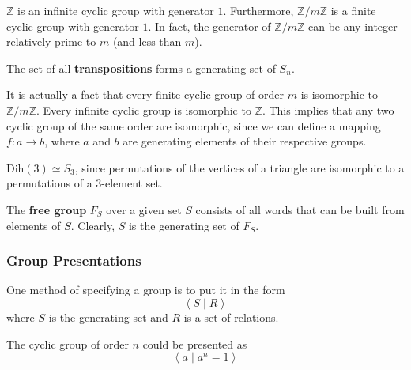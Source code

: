 \documentclass{article}
\begin{document}
      \begin{example}
        $\mathbb{Z}$ is an infinite cyclic group with generator $1$. Furthermore, $\mathbb{Z}/m\mathbb{Z}$ is a finite cyclic group with generator $1$. In fact, the generator of $\mathbb{Z}/m\mathbb{Z}$ can be any integer relatively prime to $m$ (and less than $m$). \end{example}

      \begin{example}
        The set of all \textbf{transpositions} forms a generating set of $S_{n}$. 
      \end{example}

      It is actually a fact that every finite cyclic group of order $m$ is isomorphic to $\mathbb{Z}/m\mathbb{Z}$. Every infinite cyclic group is isomorphic to $\mathbb{Z}$. This implies that any two cyclic group of the same order are isomorphic, since we can define a mapping $f:a\longrightarrow b$, where $a$ and $b$ are generating elements of their respective groups. 

      \begin{example}
        Dih$(3) \simeq S_{3}$, since permutations of the vertices of a triangle are isomorphic to a permutations of a 3-element set. 
      \end{example}

      \begin{definition}
        The \textbf{free group} $F_{S}$ over a given set $S$ consists of all words that can be built from elements of $S$. Clearly, $S$ is the generating set of $F_{S}$. 
      \end{definition}

    \subsubsection{Group Presentations}

      One method of specifying a group is to put it in the form
      \begin{equation}
        \big\langle \; S \; | \; R \;\big\rangle
      \end{equation}
      where $S$ is the generating set and $R$ is a set of relations. 

      \begin{example}
        The cyclic group of order $n$ could be presented as
        \begin{equation}
          \big\langle \; a \; | \; a^{n} = 1 \;\big\rangle
        \end{equation}
      \end{example}
\end{document}
